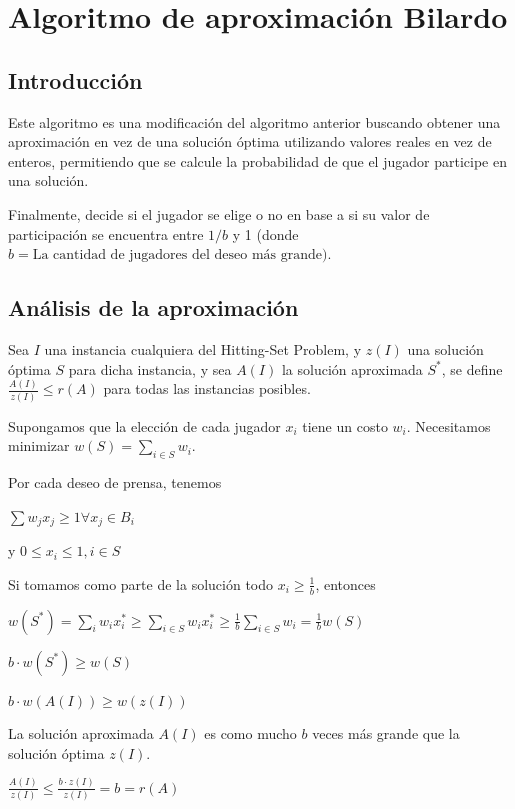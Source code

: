 \documentclass{estilo}
\begin{document}
\newpage

\section{Algoritmo de aproximación Bilardo}

\subsection{Introducción}

Este algoritmo es una modificación del algoritmo anterior buscando obtener una aproximación en vez de una solución óptima utilizando valores reales en vez de enteros, permitiendo que se calcule la probabilidad de que el jugador participe en una solución.

Finalmente, decide si el jugador se elige o no en base a si su valor de participación se encuentra entre $1/b$  y 1 (donde $b = \text{La cantidad de jugadores del deseo más grande)}$.

\subsection{Análisis de la aproximación}

Sea $I$ una instancia cualquiera del Hitting-Set Problem, y $z(I)$ una solución óptima $S$ para dicha instancia, y sea $A(I)$ la solución aproximada $S^*$, se define $\frac{A(I)}{z(I)} \leq r(A)$ para todas las instancias posibles.

Supongamos que la elección de cada jugador $x_i$ tiene un costo $w_i$. Necesitamos minimizar $w(S) = \sum_{i \in S} w_i$.

Por cada deseo de prensa, tenemos

$\sum w_j x_j \ge 1 \forall x_j \in B_i$

y $0 \le x_i \le 1, i \in S$

Si tomamos como parte de la solución todo $x_i \ge \frac{1}{b}$, entonces

$w(S^*) = \sum_{i} w_i x_i^* \ge \sum_{i \in S} w_i x_i^* \ge \frac{1}{b} \sum_{i \in S} w_i = \frac{1}{b} w(S)$

$b \cdot w(S^*) \ge w(S)$

$b \cdot w(A(I)) \ge w(z(I))$

La solución aproximada $A(I)$ es como mucho $b$ veces más grande que la solución óptima $z(I)$.

$\frac{A(I)}{z(I)}
\le \frac{b \cdot z(I)}{z(I)} = b = r(A)$

    
\end{document}
